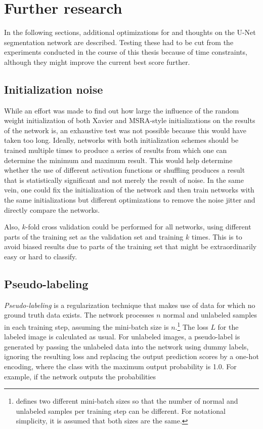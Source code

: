 \chapter {Further research}
\label{chap:futurework}

In the following sections, additional optimizations for and thoughts on the U-Net segmentation network are described. Testing these had to be cut from the experiments conducted in the course of this thesis because of time constraints, although they might improve the current best score further.

\section {Initialization noise}

While an effort was made to find out how large the influence of the random weight initialization of both Xavier and MSRA-style initializations on the results of the network is, an exhaustive test was not possible because this would have taken too long. Ideally, networks with both initialization schemes should be trained multiple times to produce a series of results from which one can determine the minimum and maximum result. This would help determine whether the use of different activation functions or shuffling produces a result that is statistically significant and not merely the result of noise. In the same vein, one could fix the initialization of the network and then train networks with the same initializations but different optimizations to remove the noise jitter and directly compare the networks.

Also, $k$-fold cross validation could be performed for all networks, using different parts of the training set as the validation set and training $k$ times. This is to avoid biased results due to parts of the training set that might be extraordinarily easy or hard to classify.


	\section {Pseudo-labeling}
\label{subsec:pseudo_label}

\textit{Pseudo-labeling} \cite{pseudo_label} is a regularization technique that makes use of data for which no ground truth data exists. The network processes $n$ normal and unlabeled samples in each training step, assuming the mini-batch size is $n$.\footnote{\cite{pseudo_label} defines two different mini-batch sizes so that the number of normal and unlabeled samples per training step can be different. For notational simplicity, it is assumed that both sizes are the same.} The loss $L$ for the labeled image is calculated as usual. For unlabeled images, a pseudo-label is generated by passing the unlabeled data into the network using dummy labels, ignoring the resulting loss and replacing the output prediction scores by a one-hot encoding, where the class with the maximum output probability is 1.0. For example, if the network outputs the probabilities 

